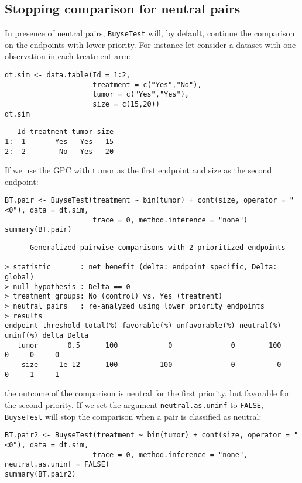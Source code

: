 \documentclass[12pt]{article}
\begin{document}
\subsection{Stopping comparison for neutral pairs}
\label{sec:org32f1b0e}
In presence of neutral pairs, \texttt{BuyseTest} will, by default, continue
the comparison on the endpoints with lower priority. For instance let
consider a dataset with one observation in each treatment arm:
\lstset{language=r,label= ,caption= ,captionpos=b,numbers=none}
\begin{lstlisting}
dt.sim <- data.table(Id = 1:2,
					 treatment = c("Yes","No"),
					 tumor = c("Yes","Yes"),
					 size = c(15,20))
dt.sim
\end{lstlisting}

\begin{verbatim}
   Id treatment tumor size
1:  1       Yes   Yes   15
2:  2        No   Yes   20
\end{verbatim}

\clearpage

If we use the GPC with tumor as the first endpoint and size as the
second endpoint:
\lstset{language=r,label= ,caption= ,captionpos=b,numbers=none}
\begin{lstlisting}
BT.pair <- BuyseTest(treatment ~ bin(tumor) + cont(size, operator = "<0"), data = dt.sim,
					 trace = 0, method.inference = "none")
summary(BT.pair)
\end{lstlisting}

\begin{verbatim}
      Generalized pairwise comparisons with 2 prioritized endpoints

> statistic       : net benefit (delta: endpoint specific, Delta: global) 
> null hypothesis : Delta == 0 
> treatment groups: No (control) vs. Yes (treatment) 
> neutral pairs   : re-analyzed using lower priority endpoints
> results
endpoint threshold total(%) favorable(%) unfavorable(%) neutral(%) uninf(%) delta Delta
   tumor       0.5      100            0              0        100        0     0     0
    size     1e-12      100          100              0          0        0     1     1
\end{verbatim}

the outcome of the comparison is neutral for the first priority, but
favorable for the second priority. If we set the argument
\texttt{neutral.as.uninf} to \texttt{FALSE}, \texttt{BuyseTest} will stop the comparison
when a pair is classified as neutral:
\lstset{language=r,label= ,caption= ,captionpos=b,numbers=none}
\begin{lstlisting}
BT.pair2 <- BuyseTest(treatment ~ bin(tumor) + cont(size, operator = "<0"), data = dt.sim,
					 trace = 0, method.inference = "none", neutral.as.uninf = FALSE)
summary(BT.pair2)
\end{lstlisting}
\end{document}
